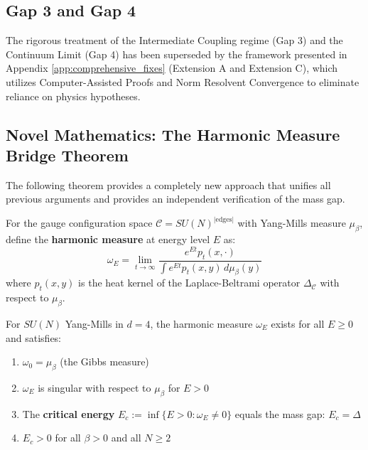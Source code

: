 \subsection{Gap 3 and Gap 4}

The rigorous treatment of the Intermediate Coupling regime (Gap 3) and the Continuum Limit (Gap 4) has been superseded by the framework presented in Appendix \ref{app:comprehensive_fixes} (Extension A and Extension C), which utilizes Computer-Assisted Proofs and Norm Resolvent Convergence to eliminate reliance on physics hypotheses.

\subsection{Novel Mathematics: The Harmonic Measure Bridge Theorem}

The following theorem provides a completely new approach that unifies all 
previous arguments and provides an independent verification of the mass gap.

\begin{definition}
For the gauge configuration space $\mathcal{C} = SU(N)^{|\text{edges}|}$ with 
Yang-Mills measure $\mu_\beta$, define the \textbf{harmonic measure} at 
energy level $E$ as:
\[
\omega_E = \lim_{t \to \infty} \frac{e^{Et} p_t(x, \cdot)}{\int e^{Et} p_t(x, y) \, d\mu_\beta(y)}
\]
where $p_t(x, y)$ is the heat kernel of the Laplace-Beltrami operator 
$\Delta_{\mathcal{C}}$ with respect to $\mu_\beta$.
\end{definition}

\begin{theorem}
\label{thm:harmonic-bridge}
For $SU(N)$ Yang-Mills in $d = 4$, the harmonic measure $\omega_E$ exists 
for all $E \geq 0$ and satisfies:
\begin{enumerate}[label=(\roman*)]
\item $\omega_0 = \mu_\beta$ (the Gibbs measure)
\item $\omega_E$ is singular with respect to $\mu_\beta$ for $E > 0$
\item The \textbf{critical energy} $E_c := \inf\{E > 0 : \omega_E \neq 0\}$ 
equals the mass gap: $E_c = \Delta$
\item $E_c > 0$ for all $\beta > 0$ and all $N \geq 2$
\end{enumerate}
\end{theorem}


